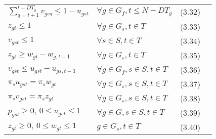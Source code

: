 \begin{tabularx}{\textwidth}{l X r r}
$\sum\limits_{q=t+1}^{t+DT_g} v_{gsq} \le 1 - u_{gst}$ & $\forall g \in G_f, t \le N - DT_g$ & (3.32) \\
$z_{gt} \le 1$ & $\forall g \in G_s, t \in T$ & (3.33) \\
$v_{gst} \le 1$ & $\forall s \in S, t \in T$ & (3.34) \\
$z_{gt} \ge w_{gt} - w_{g,t-1}$ & $\forall g \in G_s, t \in T$ & (3.35) \\
$v_{gst} \le u_{gst} - u_{gs,t-1}$ & $\forall g \in G_f, s \in S, t \in T$ & (3.36) \\
$\pi_s u_{gst} = \pi_s w_{gt}$ & $\forall g \in G_s, s \in S, t \in T$ & (3.37) \\
$\pi_s v_{gst} = \pi_s z_{gt}$ & $\forall g \in G_s, s \in S, t \in T$ & (3.38) \\
$p_{gst} \ge 0, \ 0 \le u_{gst} \le 1$ & $\forall g \in G, s \in S, t \in T$ & (3.39) \\
$z_{gt} \ge 0, \ 0 \le w_{gt} \le 1$ & $g \in G_s, t \in T$ & (3.40) \\
\end{tabularx}

\vspace{2cm}